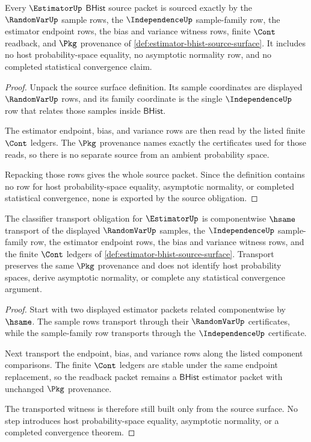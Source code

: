 \begin{theorem}
\label{thm:estimator-source-obligation}
Every $\EstimatorUp$ $\mathsf{BHist}$ source packet is sourced exactly by the
$\RandomVarUp$ sample rows, the $\IndependenceUp$ sample-family row, the
estimator endpoint rows, the bias and variance witness rows, finite $\Cont$
readback, and $\Pkg$ provenance of
\autoref{def:estimator-bhist-source-surface}. It includes no host
probability-space equality, no asymptotic normality row, and no completed
statistical convergence claim.
\end{theorem}
\begin{proof}
Unpack the source surface definition. Its sample coordinates are displayed
$\RandomVarUp$ rows, and its family coordinate is the single
$\IndependenceUp$ row that relates those samples inside $\mathsf{BHist}$.

The estimator endpoint, bias, and variance rows are then read by the listed
finite $\Cont$ ledgers. The $\Pkg$ provenance names exactly the certificates
used for those reads, so there is no separate source from an ambient
probability space.

Repacking those rows gives the whole source packet. Since the definition
contains no row for host probability-space equality, asymptotic normality, or
completed statistical convergence, none is exported by the source obligation.
\end{proof}


\begin{theorem}
\label{thm:estimator-transport-obligation}
The classifier transport obligation for $\EstimatorUp$ is componentwise
$\hsame$ transport of the displayed $\RandomVarUp$ samples, the
$\IndependenceUp$ sample-family row, the estimator endpoint rows, the bias and
variance witness rows, and the finite $\Cont$ ledgers of
\autoref{def:estimator-bhist-source-surface}. Transport preserves the same
$\Pkg$ provenance and does not identify host probability spaces, derive
asymptotic normality, or complete any statistical convergence argument.
\end{theorem}
\begin{proof}
Start with two displayed estimator packets related componentwise by $\hsame$.
The sample rows transport through their $\RandomVarUp$ certificates, while the
sample-family row transports through the $\IndependenceUp$ certificate.

Next transport the endpoint, bias, and variance rows along the listed
component comparisons. The finite $\Cont$ ledgers are stable under the same
endpoint replacement, so the readback packet remains a $\mathsf{BHist}$
estimator packet with unchanged $\Pkg$ provenance.

The transported witness is therefore still built only from the source surface.
No step introduces host probability-space equality, asymptotic normality, or a
completed convergence theorem.
\end{proof}

